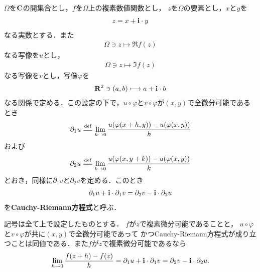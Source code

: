 	$\Omega$を$\mathbf{C}$の開集合とし，$f$を$\Omega$上の複素数値関数とし，
	$z$を$\Omega$の要素とし，$x$と$y$を
	\begin{align}
		z = x + \mathbf{i} \cdot y
	\end{align}
	なる実数とする．また
	\begin{align}
		\Omega \ni z \longmapsto \Re{f(z)}
	\end{align}
	なる写像を$u$とし，
	\begin{align}
		\Omega \ni z \longmapsto \Im{f(z)}
	\end{align}
	なる写像を$v$とし，写像$\varphi$を
	\begin{align}
		\mathbf{R}^2 \ni (a,b) \longmapsto a + \mathbf{i} \cdot b
	\end{align}
	なる関係で定める．この設定の下で，$u \circ \varphi$と$v \circ \varphi$が$(x,y)$で全微分可能であるとき
	\begin{align}
		\partial_1 u \defeq \lim_{h \to 0} \frac{u(\varphi(x+h,y)) - u(\varphi(x,y))}{h}
	\end{align}
	および
	\begin{align}
		\partial_2 u \defeq \lim_{k \to 0} \frac{u(\varphi(x,y+k)) - u(\varphi(x,y))}{k}
	\end{align}
	とおき，同様に$\partial_1 v$と$\partial_2 v$を定める．このとき
	\begin{align}
		\partial_1 u + \mathbf{i} \cdot \partial_1 v = \partial_2 v - \mathbf{i} \cdot \partial_2 u
	\end{align}
	を{\bf Cauchy-Riemann方程式}と呼ぶ．
	
	\begin{screen}
		\begin{thm}
			記号は全て上で設定したものとする．
			$f$が$z$で複素微分可能であることと，
			$u \circ \varphi$と$v \circ \varphi$が共に$(x,y)$で全微分可能であって
			かつCauchy-Riemann方程式が成り立つことは同値である．また$f$が$z$で複素微分可能であるなら
			\begin{align}
				\lim_{h \to 0} \frac{f(z+h) - f(z)}{h}
				= \partial_1 u + \mathbf{i} \cdot \partial_1 v
				= \partial_2 v - \mathbf{i} \cdot \partial_2 u.
			\end{align}
		\end{thm}
	\end{screen}
	
